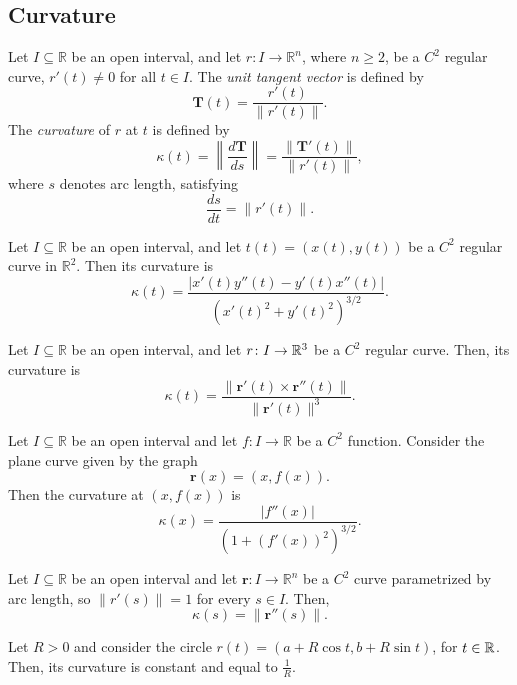 \subsection{Curvature}

\begin{df}
Let $I\subseteq\mathbb{R}$ be an open interval, and let $r:I\to\mathbb{R}^n$,
where $n\geq 2$, be a $C^2$ regular curve, $r'(t) \neq 0$ for all $t \in I$.
The \emph{unit tangent vector} is defined by
\[
\mathbf{T}(t)
=
\frac{r'(t)}
{\|r'(t)\|}.
\]
The \emph{curvature} of $r$ at $t$
is defined by
\[
\kappa(t)
=
\left\|\frac{d\mathbf{T}}{ds}\right\|
=
\frac{\|\mathbf{T}'(t)\|}
{\|r'(t)\|},
\]
where $s$ denotes arc length, satisfying
\[
\frac{ds}{dt}=\|r'(t)\|.
\]
\end{df}

\begin{theorem}
Let $I\subseteq\mathbb{R}$ be an open interval,
and let $t(t) = (x(t), y(t))$ be a $C^2$ regular curve in $\mathbb{R}^2$.
Then its curvature is
\[
\kappa(t)=
\frac{|x'(t)y''(t)-y'(t)x''(t)|}
{(x'(t)^2+y'(t)^2)^{3/2}}.
\]
\end{theorem}

\begin{theorem}
Let $I\subseteq\mathbb{R}$ be an open interval,
and let $r \colon I \rightarrow \mathbb{R}^3$ be a $C^2$ regular curve. 
Then, its curvature is
\[
\kappa(t)=
\frac{\|\mathbf{r}'(t)\times\mathbf{r}''(t)\|}
{\|\mathbf{r}'(t)\|^3}.
\]
\end{theorem}

\begin{corollary}
Let $I\subseteq\mathbb{R}$ be an open interval and let $f:I\to\mathbb{R}$ be a $C^2$ function.
Consider the plane curve given by the graph
\[
\mathbf{r}(x)=(x,f(x)).
\]
Then the curvature at $(x,f(x))$ is
\[
\kappa(x)=
\frac{|f''(x)|}
{(1+(f'(x))^2)^{3/2}}.
\]
\end{corollary}

\begin{theorem}
Let $I\subseteq\mathbb{R}$ be an open interval
and let $\mathbf{r}:I\to\mathbb{R}^n$
be a $C^2$ curve parametrized by arc length, so $\|r'(s)\| = 1$ for every $s \in I$. Then,
\[
\kappa(s)=\|\mathbf{r}''(s)\|.
\]
\end{theorem}

\begin{theorem}
Let $R>0$ and consider the circle $r(t) = (a + R \cos t, b + R \sin t)$, for $t \in \mathbb{R}$. Then, 
its curvature is constant and equal to $\frac{1}{R}$.
\end{theorem}


